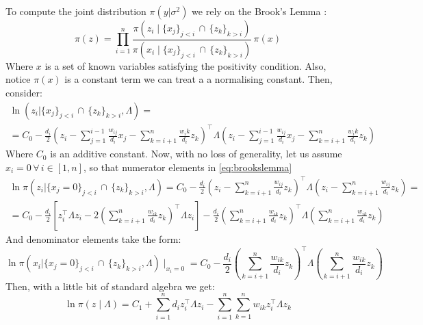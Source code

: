 \documentclass[openany]{book}
\begin{document}
To compute the joint distribution $\pi(y|\sigma^2)$ we rely on the Brook's Lemma \citep{HammersleyClifford, CAR}:
 \begin{equation}
 \pi(z) = \prod_{i=1}^n \frac{
 \pi \left(z_i \mid \lbrace x_j \rbrace_{j<i} \, \cap \, \lbrace z_k \rbrace_{k>i}  \right)
 }{
 \pi \left(x_i \mid \lbrace x_j \rbrace_{j<i} \, \cap \, \lbrace z_k \rbrace_{k>i}  \right)
 } \, \pi(x)
 \label{eq:brookslemma}
 \end{equation}
Where $x$ is a set of known variables satisfying the positivity condition. Also, notice  $\pi(x)$ is a constant term we can treat a a normalising constant. Then, consider:
%
\begin{align}
\ln \left(z_i | \lbrace x_j \rbrace_{j<i} \, \cap \, \lbrace z_k \rbrace_{k>i}, \Lambda  \right) = \\ =
C_0 - \frac{d_i}{2} \left( 
z_i - \sum_{j=1}^{i-1} \frac{w_{ij}}{d_i} x_j  - \sum_{k=i+1}^{n} \frac{w_ik}{d_i}z_k
\right)^{\top} \Lambda \left( 
z_i - \sum_{j=1}^{i-1} \frac{w_{ij}}{d_i} x_j  - \sum_{k=i+1}^{n} \frac{w_ik}{d_i}z_k
\right)
\end{align}
%
Where $C_0$ is an additive constant. Now, with no loss of generality, let us assume $x_i = 0 \,   \forall \, i \in [1,n]$, so that numerator elements in \ref{eq:brookslemma}
%
\begin{align}
 \ln \pi \left(z_i | \lbrace x_j =0\rbrace_{j<i} \, \cap \, \lbrace z_k \rbrace_{k>i}, \Lambda  \right) =
 C_0 - \frac{d_i}{2 } \left(z_i   -\sum_{k=i+1}^n \frac{w_{ij}}{d_i}z_k  \right) ^{\top}
 \Lambda  \left(z_i   -\sum_{k=i+1}^n \frac{w_{ij}}{d_i}z_k  \right)=  \\
 = C_0- \frac{d_i}{2 } \left[ z^{\top}_i \Lambda z_i - 
 2 \left(\sum_{k=i+1}^n    \frac{w_{ik}}{d_i}z_k\right) ^{\top} \Lambda z_i \right] 
 - \frac{d_i}{2}  \left( 
 \sum_{k=i+1}^n \frac{w_{ik}}{d_i} z_k
 \right) ^{\top} \Lambda \left( 
 \sum_{k=i+1}^n \frac{w_{ik}}{d_i} z_k
 \right)
 \label{eq:numerator}
 \end{align}
%
And denominator elements take the form:
\begin{equation}
 \ln \pi \left(x_i | \lbrace x_j =0\rbrace_{j<i} \, \cap \, \lbrace z_k \rbrace_{k>i}, \Lambda  \right)\mid_{x_i=0} = C_0 - \frac{d_i}{2}  \left( 
 \sum_{k=i+1}^n \frac{w_{ik}}{d_i} z_k
 \right) ^{\top} \Lambda \left( 
 \sum_{k=i+1}^n \frac{w_{ik}}{d_i} z_k
 \right)
\label{eq:denominator}
\end{equation}
Then, with a little bit of standard algebra we get:
\begin{equation}
\ln \pi(z \mid \Lambda) = C_1 + \sum_{i=1}^n d_i z_i ^{\top} \Lambda z_i -
\sum_{i=1}^n \sum_{k=1}^n w_{ik} z_i^{\top} \Lambda z_k
\end{equation}
\end{document}
